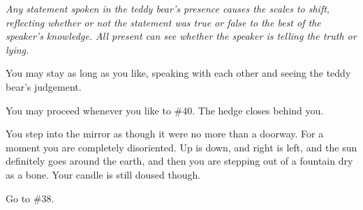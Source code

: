 \documentclass[white]{gl2018}
\begin{document}
\begin{large}
\begin{location}{5}
\textit{Any statement spoken in the teddy bear's presence causes the scales to shift, reflecting whether or not the statement was true or false to the best of the speaker's knowledge.  All present can see whether the speaker is telling the truth or lying.}

You may stay as long as you like, speaking with each other and seeing the teddy bear's judgement. 

\begin{fromhere}
You may proceed whenever you like to \#40.  The hedge closes behind you.
\end{fromhere}
\end{location}
\begin{location}{6}
You step into the mirror as though it were no more than a doorway. For a moment you are completely disoriented. Up is down, and right is left, and the sun definitely goes around the earth, and then you are stepping out of a fountain dry as a bone. Your candle is still doused though.

\begin{fromhere}
Go to \#38.\\


\end{fromhere}
\end{location}
\end{large}
\end{document}
